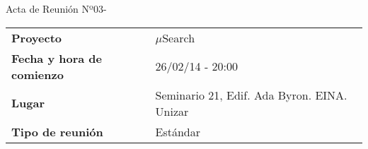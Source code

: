 \begin{center}	
\Large{Acta de Reunión Nº03\hspace{0.25em}-\hspace{0.25em}\tituloReunion}
\end{center}
\vspace{1.5em}

\begin{longtable}{ | L{\tabcolsep} |
				     L{\tabcolsep} | }
\hline %
  \\
\hline %
{\bf Proyecto} & $\mu$Search \\ 
\hline %
{\bf Fecha y hora de comienzo} & 26/02/14 - 20:00 \\
\hline %
{\bf Lugar} & Seminario 21, Edif. Ada Byron. EINA. Unizar \\
\hline %
{\bf Tipo de reunión} & Estándar \\
\hline %
\end{longtable}


